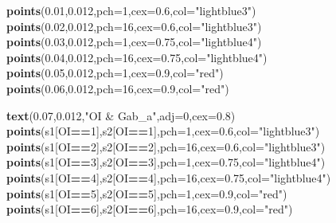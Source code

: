 \documentclass[]{article}
\newenvironment{Shaded}{\begin{snugshade}}{\end{snugshade}}
\newcommand{\DataTypeTok}[1]{\textcolor[rgb]{0.13,0.29,0.53}{#1}}
\newcommand{\DecValTok}[1]{\textcolor[rgb]{0.00,0.00,0.81}{#1}}
\newcommand{\FloatTok}[1]{\textcolor[rgb]{0.00,0.00,0.81}{#1}}
\newcommand{\KeywordTok}[1]{\textcolor[rgb]{0.13,0.29,0.53}{\textbf{#1}}}
\newcommand{\NormalTok}[1]{#1}
\newcommand{\OperatorTok}[1]{\textcolor[rgb]{0.81,0.36,0.00}{\textbf{#1}}}
\newcommand{\StringTok}[1]{\textcolor[rgb]{0.31,0.60,0.02}{#1}}
\begin{document}
\begin{Shaded}
\begin{Highlighting}[]
\KeywordTok{points}\NormalTok{(}\FloatTok{0.01}\NormalTok{,}\FloatTok{0.012}\NormalTok{,}\DataTypeTok{pch=}\DecValTok{1}\NormalTok{,}\DataTypeTok{cex=}\FloatTok{0.6}\NormalTok{,}\DataTypeTok{col=}\StringTok{"lightblue3"}\NormalTok{)}
\KeywordTok{points}\NormalTok{(}\FloatTok{0.02}\NormalTok{,}\FloatTok{0.012}\NormalTok{,}\DataTypeTok{pch=}\DecValTok{16}\NormalTok{,}\DataTypeTok{cex=}\FloatTok{0.6}\NormalTok{,}\DataTypeTok{col=}\StringTok{"lightblue3"}\NormalTok{)}
\KeywordTok{points}\NormalTok{(}\FloatTok{0.03}\NormalTok{,}\FloatTok{0.012}\NormalTok{,}\DataTypeTok{pch=}\DecValTok{1}\NormalTok{,}\DataTypeTok{cex=}\FloatTok{0.75}\NormalTok{,}\DataTypeTok{col=}\StringTok{"lightblue4"}\NormalTok{)}
\KeywordTok{points}\NormalTok{(}\FloatTok{0.04}\NormalTok{,}\FloatTok{0.012}\NormalTok{,}\DataTypeTok{pch=}\DecValTok{16}\NormalTok{,}\DataTypeTok{cex=}\FloatTok{0.75}\NormalTok{,}\DataTypeTok{col=}\StringTok{"lightblue4"}\NormalTok{)}
\KeywordTok{points}\NormalTok{(}\FloatTok{0.05}\NormalTok{,}\FloatTok{0.012}\NormalTok{,}\DataTypeTok{pch=}\DecValTok{1}\NormalTok{,}\DataTypeTok{cex=}\FloatTok{0.9}\NormalTok{,}\DataTypeTok{col=}\StringTok{"red"}\NormalTok{)}
\KeywordTok{points}\NormalTok{(}\FloatTok{0.06}\NormalTok{,}\FloatTok{0.012}\NormalTok{,}\DataTypeTok{pch=}\DecValTok{16}\NormalTok{,}\DataTypeTok{cex=}\FloatTok{0.9}\NormalTok{,}\DataTypeTok{col=}\StringTok{"red"}\NormalTok{)}

\KeywordTok{text}\NormalTok{(}\FloatTok{0.07}\NormalTok{,}\FloatTok{0.012}\NormalTok{,}\StringTok{"OI & Gab_a"}\NormalTok{,}\DataTypeTok{adj=}\DecValTok{0}\NormalTok{,}\DataTypeTok{cex=}\FloatTok{0.8}\NormalTok{)}
\KeywordTok{points}\NormalTok{(s1[OI}\OperatorTok{==}\DecValTok{1}\NormalTok{],s2[OI}\OperatorTok{==}\DecValTok{1}\NormalTok{],}\DataTypeTok{pch=}\DecValTok{1}\NormalTok{,}\DataTypeTok{cex=}\FloatTok{0.6}\NormalTok{,}\DataTypeTok{col=}\StringTok{"lightblue3"}\NormalTok{)}
\KeywordTok{points}\NormalTok{(s1[OI}\OperatorTok{==}\DecValTok{2}\NormalTok{],s2[OI}\OperatorTok{==}\DecValTok{2}\NormalTok{],}\DataTypeTok{pch=}\DecValTok{16}\NormalTok{,}\DataTypeTok{cex=}\FloatTok{0.6}\NormalTok{,}\DataTypeTok{col=}\StringTok{"lightblue3"}\NormalTok{)}
\KeywordTok{points}\NormalTok{(s1[OI}\OperatorTok{==}\DecValTok{3}\NormalTok{],s2[OI}\OperatorTok{==}\DecValTok{3}\NormalTok{],}\DataTypeTok{pch=}\DecValTok{1}\NormalTok{,}\DataTypeTok{cex=}\FloatTok{0.75}\NormalTok{,}\DataTypeTok{col=}\StringTok{"lightblue4"}\NormalTok{)}
\KeywordTok{points}\NormalTok{(s1[OI}\OperatorTok{==}\DecValTok{4}\NormalTok{],s2[OI}\OperatorTok{==}\DecValTok{4}\NormalTok{],}\DataTypeTok{pch=}\DecValTok{16}\NormalTok{,}\DataTypeTok{cex=}\FloatTok{0.75}\NormalTok{,}\DataTypeTok{col=}\StringTok{"lightblue4"}\NormalTok{)}
\KeywordTok{points}\NormalTok{(s1[OI}\OperatorTok{==}\DecValTok{5}\NormalTok{],s2[OI}\OperatorTok{==}\DecValTok{5}\NormalTok{],}\DataTypeTok{pch=}\DecValTok{1}\NormalTok{,}\DataTypeTok{cex=}\FloatTok{0.9}\NormalTok{,}\DataTypeTok{col=}\StringTok{"red"}\NormalTok{)}
\KeywordTok{points}\NormalTok{(s1[OI}\OperatorTok{==}\DecValTok{6}\NormalTok{],s2[OI}\OperatorTok{==}\DecValTok{6}\NormalTok{],}\DataTypeTok{pch=}\DecValTok{16}\NormalTok{,}\DataTypeTok{cex=}\FloatTok{0.9}\NormalTok{,}\DataTypeTok{col=}\StringTok{"red"}\NormalTok{)}


\end{Highlighting}
\end{Shaded}
\end{document}
